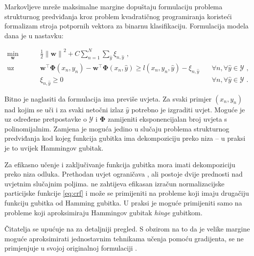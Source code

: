 Markovljeve mreže maksimalne margine  dopuštaju formulaciju problema strukturnog predviđanja kroz
problem kvadratičnog programiranja  koristeći
formalizam stroja potpornih vektora za binarnu klasifikaciju. Formulacija
\mmmm{} modela dana je u nastavku:

\begin{equation}\label{eq:mmmm}
\begin{aligned}
  \min_{\mathbf{w}} & \quad \frac{1}{2} {\lVert\mathbf{w}\lVert}^2 + C \sum_{n=1}^{N}\sum_{\hat{y}} \xi_{n,\hat{y}} \text{ ,}              & \\
  \text{uz uvjete}  & \quad \mathbf{w}^\top \mathbf{\Phi}(x_n, y_n) - \mathbf{w}^\top \mathbf{\Phi}(x_n, \hat{y}) \ge l(x_n, y_n, \hat{y}) - \xi_{n,\hat{y}} & \quad \forall n, \forall \hat{y} \in \mathcal{Y} \text{ ,}\\
                    & \quad \xi_{n,\hat{y}} \ge 0                                                                                          & \quad \forall n, \forall \hat{y} \in \mathcal{Y} \text{ .}
\end{aligned}
\end{equation}

\noindent
Bitno je naglasiti da \mmmm{} formulacija ima previše uvjeta. Za svaki primjer
$(x_n, y_n)$ nad kojim se uči i za svaki netočni izlaz $\hat{y}$ potrebno je
izgraditi uvjet. Moguće je uz određene pretpostavke o $\mathcal{Y}$ i
$\mathbf{\Phi}$ zamijeniti eksponencijalan broj uvjeta s polinomijalnim. Zamjena
je moguća jedino u slučaju problema strukturnog predviđanja kod kojeg funkcija
gubitka ima dekompoziciju preko niza -- u praksi je to uvijek Hammingov gubitak.

Za efikasno učenje i zaključivanje funkcija gubitka mora imati dekompoziciju
preko niza odluka. Prethodan uvjet ograničava \mmmm{}, ali postoje dvije
prednosti nad uvjetnim slučajnim poljima. \mmmm{} ne zahtijeva efikasan izračun
normalizacijske particijske funkcije \ref{eq:crf} i može se primijeniti na
probleme koji imaju drugačiju funkciju gubitka od Hamming gubitka. U praksi je
moguće primijeniti \mmmm{} samo na probleme koji aproksimiraju Hammingov gubitak
\textit{hinge} gubitkom.

Čitatelja se upućuje na \citep{taskar2003maximum} za detaljniji pregled. S
obzirom na to da je velike margine moguće aproksimirati jednostavnim tehnikama
učenja pomoću gradijenta, \mmmm{} se ne primjenjuje u svojoj originalnoj
formulaciji \citep{daume2005learning, ratliff2006maximum}.
